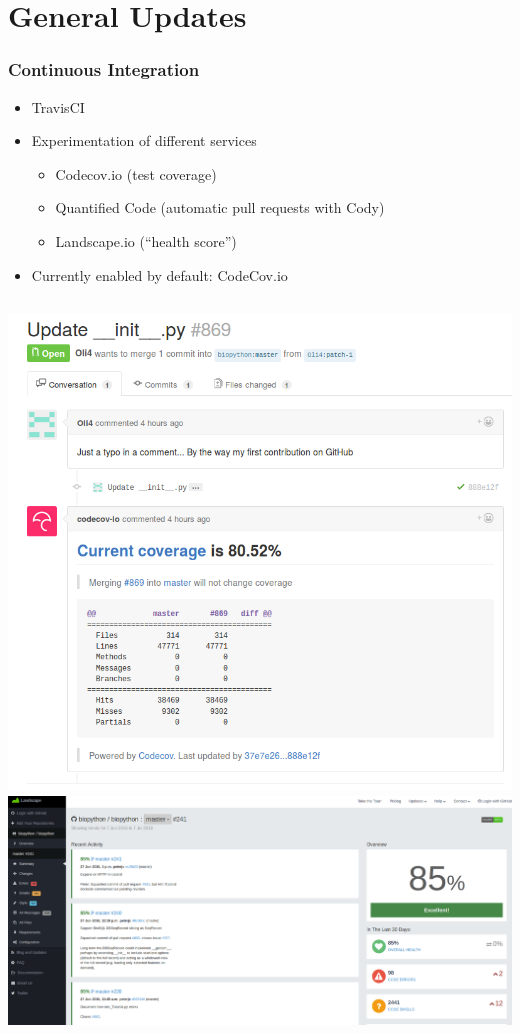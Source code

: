 \documentclass[trans]{beamer}
\begin{document}

\section{General Updates}
\frame
{
  \frametitle{Continuous Integration}

  \begin{itemize}
  \item TravisCI
  \item Experimentation of different services
  \begin{itemize}
  \item Codecov.io (test coverage)
  \item Quantified Code (automatic pull requests with Cody)
  \item Landscape.io (``health score'')
  \end{itemize}
  \item Currently enabled by default: CodeCov.io
  \end{itemize}

  \begin{columns}
  \includegraphics[width=1\textwidth]{bp-codecov.png}
  \includegraphics[width=1\textwidth]{bp-landscape.png}
  \end{columns}
}
\end{document}
